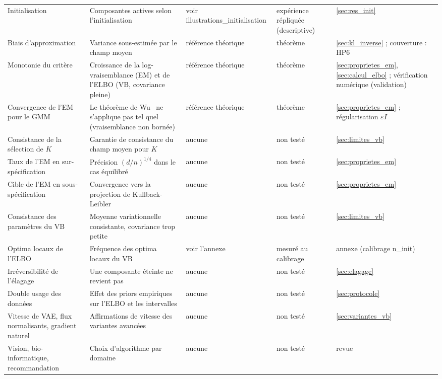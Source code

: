{\begin{longtable}{>{\raggedright\arraybackslash}p{2.40cm}>{\raggedright\arraybackslash}p{4.20cm}>{\raggedright\arraybackslash}p{4.60cm}>{\raggedright\arraybackslash}p{2.20cm}>{\raggedright\arraybackslash}p{1.90cm}}
Initialisation & Composantes actives selon l'initialisation & voir illustrations\_initialisation & expérience répliquée (descriptive) & \ref{sec:res_init} \\
Biais d'approximation & Variance sous-estimée par le champ moyen & référence théorique & théorème & \ref{sec:kl_inverse} \cite{bishop2006} ; couverture : HP6 \\
Monotonie du critère & Croissance de la log-vraisemblance (EM) et de l'ELBO (VB, covariance pleine) & référence théorique & théorème & \ref{sec:proprietes_em}, \ref{sec:calcul_elbo} ; vérification numérique (validation) \\
Convergence de l'EM pour le GMM & Le théorème de Wu~\cite{wu1983} ne s'applique pas tel quel (vraisemblance non bornée) & référence théorique & théorème & \ref{sec:proprietes_em} ; régularisation $\varepsilon I$ \\
Consistance de la sélection de $K$ & Garantie de consistance du champ moyen pour $K$ & aucune & non testé & \ref{sec:limites_vb} \\
Taux de l'EM en sur-spécification & Précision $(d/n)^{1/4}$ dans le cas équilibré \cite{dwivedi2020} & aucune & non testé & \ref{sec:proprietes_em} \\
Cible de l'EM en sous-spécification & Convergence vers la projection de Kullback-Leibler \cite{dwivedi2018} & aucune & non testé & \ref{sec:proprietes_em} \\
Consistance des paramètres du VB & Moyenne variationnelle consistante, covariance trop petite \cite{wang2006,wang2005} & aucune & non testé & \ref{sec:limites_vb} \\
Optima locaux de l'ELBO & Fréquence des optima locaux du VB & voir l'annexe & mesuré au calibrage & annexe (calibrage n\_init) \\
Irréversibilité de l'élagage & Une composante éteinte ne revient pas & aucune & non testé & \ref{sec:elagage} \\
Double usage des données & Effet des priors empiriques sur l'ELBO et les intervalles & aucune & non testé & \ref{sec:protocole} \\
Vitesse de VAE, flux normalisants, gradient naturel & Affirmations de vitesse des variantes avancées & aucune & non testé & \ref{sec:variantes_vb} \\
Vision, bio-informatique, recommandation & Choix d'algorithme par domaine & aucune & non testé & revue \\
\end{longtable}
\par{}
}

